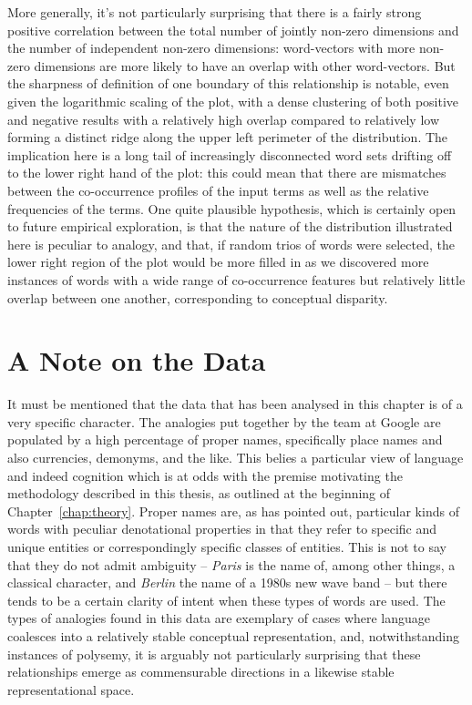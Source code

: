 More generally, it's not particularly surprising that there is a fairly strong positive correlation between the total number of jointly non-zero dimensions and the number of independent non-zero dimensions: word-vectors with more non-zero dimensions are more likely to have an overlap with other word-vectors.  But the sharpness of definition of one boundary of this relationship is notable, even given the logarithmic scaling of the plot, with a dense clustering of both positive and negative results with a relatively high overlap compared to relatively low forming a distinct ridge along the upper left perimeter of the distribution.  The implication here is a long tail of increasingly disconnected word sets drifting off to the lower right hand of the plot: this could mean that there are mismatches between the co-occurrence profiles of the input terms as well as the relative frequencies of the terms.  One quite plausible hypothesis, which is certainly open to future empirical exploration, is that the nature of the distribution illustrated here is peculiar to analogy, and that, if random trios of words were selected, the lower right region of the plot would be more filled in as we discovered more instances of words with a wide range of co-occurrence features but relatively little overlap between one another, corresponding to conceptual disparity.

\section{A Note on the Data} \label{sec:datanote}
It must be mentioned that the data that has been analysed in this chapter is of a very specific character.  The analogies put together by the team at Google are populated by a high percentage of proper names, specifically place names and also currencies, demonyms, and the like.  This belies a particular view of language and indeed cognition which is at odds with the premise motivating the methodology described in this thesis, as outlined at the beginning of Chapter~\ref{chap:theory}.  Proper names are, as \cite{Russell1905} has pointed out, particular kinds of words with peculiar denotational properties in that they refer to specific and unique entities or correspondingly specific classes of entities.  This is not to say that they do not admit ambiguity -- \emph{Paris} is the name of, among other things, a classical character, and \emph{Berlin} the name of a 1980s new wave band -- but there tends to be a certain clarity of intent when these types of words are used.  The types of analogies found in this data are exemplary of cases where language coalesces into a relatively stable conceptual representation, and, notwithstanding instances of polysemy, it is arguably not particularly surprising that these relationships emerge as commensurable directions in a likewise stable representational space.

